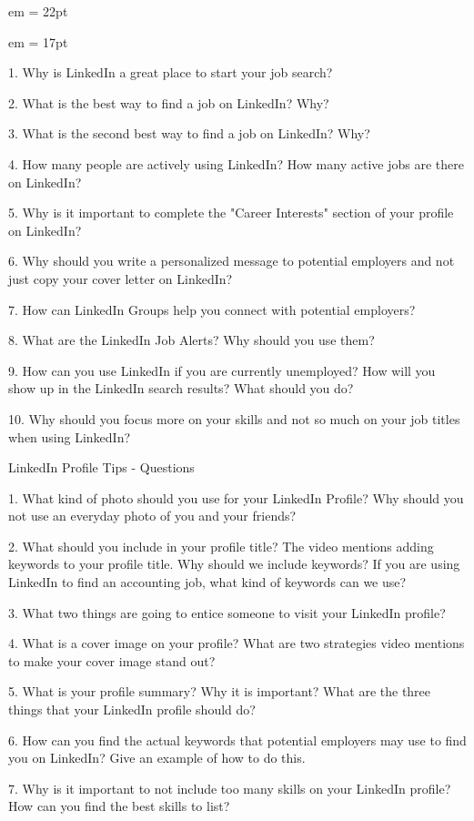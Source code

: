 

 em
\FFrk \baselineskip = 22pt



% 
 em
\FFri \baselineskip = 17pt


\par 1. Why is LinkedIn a great place to start your job search?
\par 2. What is the best way to find a job on LinkedIn? Why?
\par 3. What is the second best way to find a job on LinkedIn? Why?
\par 4. How many people are actively using LinkedIn? How many active jobs are there on LinkedIn?
\par 5. Why is it important to complete the "Career Interests" section of your profile on LinkedIn?
\par 6. Why should you write a personalized message to potential employers and not just copy your cover letter on LinkedIn?
\par 7. How can LinkedIn Groups help you connect with potential employers?
\par 8. What are the LinkedIn Job Alerts? Why should you use them?
\par 9. How can you use LinkedIn if you are currently unemployed? How will you show up in the LinkedIn search results? What should you do?
\par 10. Why should you focus more on your skills and not so much on your job titles when using LinkedIn?

\medbreak

\par LinkedIn Profile Tips - Questions
\par 1. What kind of photo should you use for your LinkedIn Profile? Why should you not use an everyday photo of you and your friends?
\par 2. What should you include in your profile title? The video mentions adding keywords to your profile title. Why should we include keywords? If you are using LinkedIn to find an accounting job, what kind of keywords can we use?
\par 3. What two things are going to entice someone to visit your LinkedIn profile?
\par 4. What is a cover image on your profile? What are two strategies video mentions to make your cover image stand out?
\par 5. What is your profile summary? Why it is important? What are the three things that your LinkedIn profile should do?
\par 6. How can you find the actual keywords that potential employers may use to find you on LinkedIn? Give an example of how to do this.
\par 7. Why is it important to not include too many skills on your LinkedIn profile? How can you find the best skills to list?


\bye

